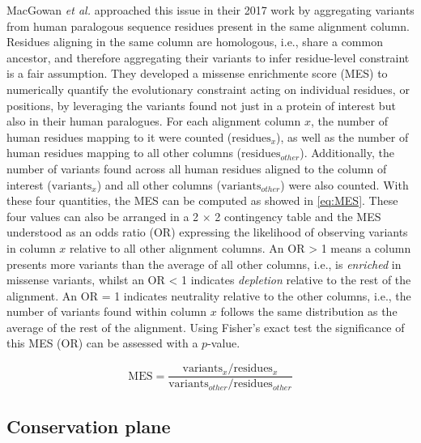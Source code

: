 MacGowan \textit{et al.} approached this issue in their 2017 work \cite{MACGOWAN_2017_VARIANTS} by aggregating variants from human paralogous sequence residues present in the same alignment column. Residues aligning in the same column are homologous, i.e., share a common ancestor, and therefore aggregating their variants to infer residue-level constraint is a fair assumption. They developed a missense enrichmente score (MES) to numerically quantify the evolutionary constraint acting on individual residues, or positions, by leveraging the variants found not just in a protein of interest but also in their human paralogues. For each alignment column $x$, the number of human residues mapping to it were counted ($\text{residues}_x$), as well as the number of human residues mapping to all other columns ($\text{residues}_{other}$). Additionally, the number of variants found across all human residues aligned to the column of interest ($\text{variants}_x$) and all other columns ($\text{variants}_{other}$) were also counted. With these four quantities, the MES can be computed as showed in \autoref{eq:MES}. These four values can also be arranged in a 2 $\times$ 2 contingency table and the MES understood as an odds ratio (OR) expressing the likelihood of observing variants in column $x$ relative to all other alignment columns. An OR > 1 means a column presents more variants than the average of all other columns, i.e., is \textit{enriched} in missense variants, whilst an OR < 1 indicates \textit{depletion} relative to the rest of the alignment. An OR = 1 indicates neutrality relative to the other columns, i.e., the number of variants found within column $x$ follows the same distribution as the average of the rest of the alignment. Using Fisher's exact test \cite{FISHER_1935_TEST} the significance of this MES (OR) can be assessed with a $p$-value.

\begin{equation}
\text{MES} = \frac{\text{variants}_x / \text{residues}_x}{\text{variants}_{other} /\text{residues}_{other}}
\label{eq:MES}
\end{equation}

\vspace{-13pt} %
\vspace{-13pt} %

\subsection{Conservation plane}

